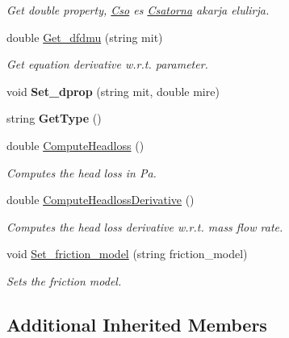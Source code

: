 \begin{DoxyCompactItemize}
\begin{DoxyCompactList}\small\item\em Get double property, \hyperlink{class_cso}{Cso} es \hyperlink{class_csatorna}{Csatorna} akarja elulirja. \end{DoxyCompactList}\item 
double \hyperlink{class_cso_a794959559cb679efb0529417e1df6556}{Get\+\_\+dfdmu} (string mit)\hypertarget{class_cso_a794959559cb679efb0529417e1df6556}{}\label{class_cso_a794959559cb679efb0529417e1df6556}

\begin{DoxyCompactList}\small\item\em Get equation derivative w.\+r.\+t. parameter. \end{DoxyCompactList}\item 
void {\bfseries Set\+\_\+dprop} (string mit, double mire)\hypertarget{class_cso_ae6db4734838a6261e89caeb53269e990}{}\label{class_cso_ae6db4734838a6261e89caeb53269e990}

\item 
string {\bfseries Get\+Type} ()\hypertarget{class_cso_a20b7469a9b992da3bc25c647cdfa23c8}{}\label{class_cso_a20b7469a9b992da3bc25c647cdfa23c8}

\item 
double \hyperlink{class_cso_a796d4ff0f69732001c91abe7e5ce7ed7}{Compute\+Headloss} ()
\begin{DoxyCompactList}\small\item\em Computes the head loss in Pa. \end{DoxyCompactList}\item 
double \hyperlink{class_cso_a5f8536643bc971ca70aebef850fa53a1}{Compute\+Headloss\+Derivative} ()
\begin{DoxyCompactList}\small\item\em Computes the head loss derivative w.\+r.\+t. mass flow rate. \end{DoxyCompactList}\item 
void \hyperlink{class_cso_a113196b16e49417924fea36b770f4d84}{Set\+\_\+friction\+\_\+model} (string friction\+\_\+model)
\begin{DoxyCompactList}\small\item\em Sets the friction model. \end{DoxyCompactList}\end{DoxyCompactItemize}
\subsection*{Additional Inherited Members}


